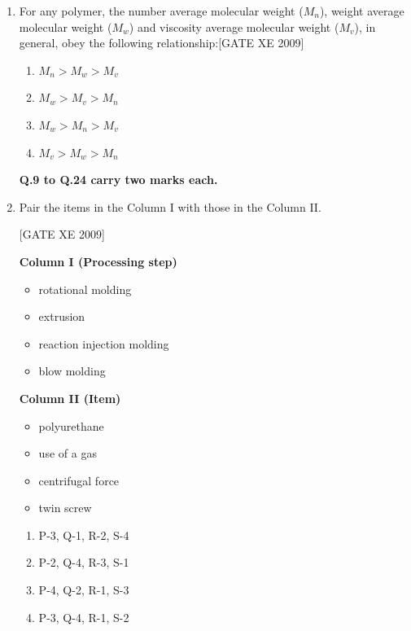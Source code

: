 \documentclass[journal,12pt,onecolumn]{IEEEtran}
\theoremstyle{remark}
\begin{document}
\begin{enumerate}
\begin{enumerate}
\begin{enumerate}[label=\textbf{Q.\arabic*.},  wide=0pt, leftmargin=*]
    \item  For any polymer, the number average molecular weight ($M_n$), weight average molecular weight ($M_w$) and viscosity average molecular weight ($M_v$), in general, obey the following relationship:\hfill[GATE XE 2009]
    \begin{multicols}{2}
    \begin{enumerate}
        \item $M_n > M_w > M_v$ 
        \item $M_w > M_v > M_n$ 
        \item $M_w > M_n > M_v$ 
        \item $M_v > M_w > M_n$
\end{enumerate}
\end{multicols}

\textbf{Q.9 to Q.24 carry two marks each.}

\vspace{1em}



\item Pair the items in the Column I with those in the Column II. 

\hfill[GATE XE 2009]\\
\begin{minipage}{0.45\textwidth}
\textbf{Column I (Processing step)}
\begin{itemize}
  \item[P.] rotational molding
  \item[Q.] extrusion
  \item[R.] reaction injection molding
  \item[S.] blow molding
\end{itemize}
\end{minipage}
\hfill
\begin{minipage}{0.45\textwidth}
\textbf{Column II (Item)}
\begin{itemize}
  \item[1.] polyurethane
  \item[2.] use of a gas
  \item[3.] centrifugal force
  \item[4.] twin screw
\end{itemize}
\end{minipage}

\vspace{0.5em}
\begin{multicols}{2}
\begin{enumerate}
\item P-3, Q-1, R-2, S-4
\item P-2, Q-4, R-3, S-1
\item P-4, Q-2, R-1, S-3
\item P-3, Q-4, R-1, S-2
\end{enumerate}
\end{multicols}


\end{enumerate}
\end{enumerate}
\end{enumerate}
\end{document}

